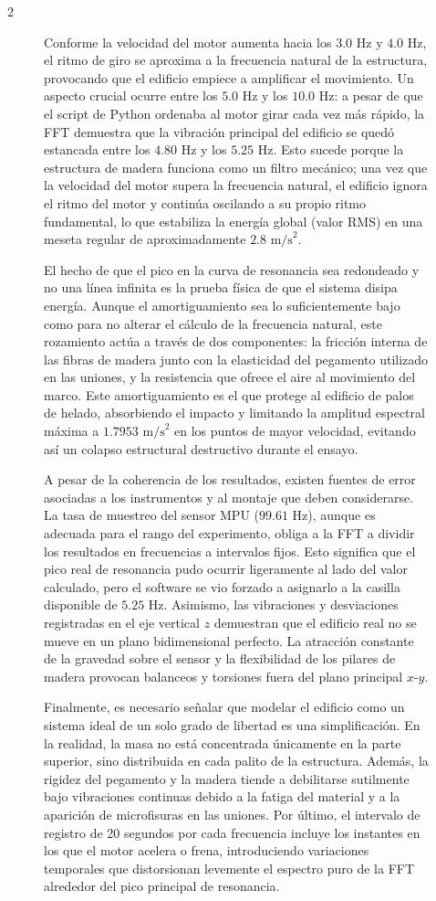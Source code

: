 \documentclass[10pt]{article}
\begin{document}
\begin{multicols}{2}
\begin{figure}[ht]
Conforme la velocidad del motor aumenta hacia los $3.0\text{ Hz}$ y $4.0\text{ Hz}$, el ritmo de giro se aproxima a la frecuencia natural de la estructura, provocando que el edificio empiece a amplificar el movimiento. Un aspecto crucial ocurre entre los $5.0\text{ Hz}$ y los $10.0\text{ Hz}$: a pesar de que el script de Python ordenaba al motor girar cada vez más rápido, la FFT demuestra que la vibración principal del edificio se quedó estancada entre los $4.80\text{ Hz}$ y los $5.25\text{ Hz}$. Esto sucede porque la estructura de madera funciona como un filtro mecánico; una vez que la velocidad del motor supera la frecuencia natural, el edificio ignora el ritmo del motor y continúa oscilando a su propio ritmo fundamental, lo que estabiliza la energía global (valor RMS) en una meseta regular de aproximadamente $2.8\text{ m/s}^2$.

El hecho de que el pico en la curva de resonancia sea redondeado y no una línea infinita es la prueba física de que el sistema disipa energía. Aunque el amortiguamiento sea lo suficientemente bajo como para no alterar el cálculo de la frecuencia natural, este rozamiento actúa a través de dos componentes: la fricción interna de las fibras de madera junto con la elasticidad del pegamento utilizado en las uniones, y la resistencia que ofrece el aire al movimiento del marco. Este amortiguamiento es el que protege al edificio de palos de helado, absorbiendo el impacto y limitando la amplitud espectral máxima a $1.7953\text{ m/s}^2$ en los puntos de mayor velocidad, evitando así un colapso estructural destructivo durante el ensayo.

A pesar de la coherencia de los resultados, existen fuentes de error asociadas a los instrumentos y al montaje que deben considerarse. La tasa de muestreo del sensor MPU ($99.61\text{ Hz}$), aunque es adecuada para el rango del experimento, obliga a la FFT a dividir los resultados en frecuencias a intervalos fijos. Esto significa que el pico real de resonancia pudo ocurrir ligeramente al lado del valor calculado, pero el software se vio forzado a asignarlo a la casilla disponible de $5.25\text{ Hz}$. Asimismo, las vibraciones y desviaciones registradas en el eje vertical $z$ demuestran que el edificio real no se mueve en un plano bidimensional perfecto. La atracción constante de la gravedad sobre el sensor y la flexibilidad de los pilares de madera provocan balanceos y torsiones fuera del plano principal $x$-$y$.

Finalmente, es necesario señalar que modelar el edificio como un sistema ideal de un solo grado de libertad es una simplificación. En la realidad, la masa no está concentrada únicamente en la parte superior, sino distribuida en cada palito de la estructura. Además, la rigidez del pegamento y la madera tiende a debilitarse sutilmente bajo vibraciones continuas debido a la fatiga del material y a la aparición de microfisuras en las uniones. Por último, el intervalo de registro de 20 segundos por cada frecuencia incluye los instantes en los que el motor acelera o frena, introduciendo variaciones temporales que distorsionan levemente el espectro puro de la FFT alrededor del pico principal de resonancia.


\end{figure}
\end{multicols}
\end{document}
